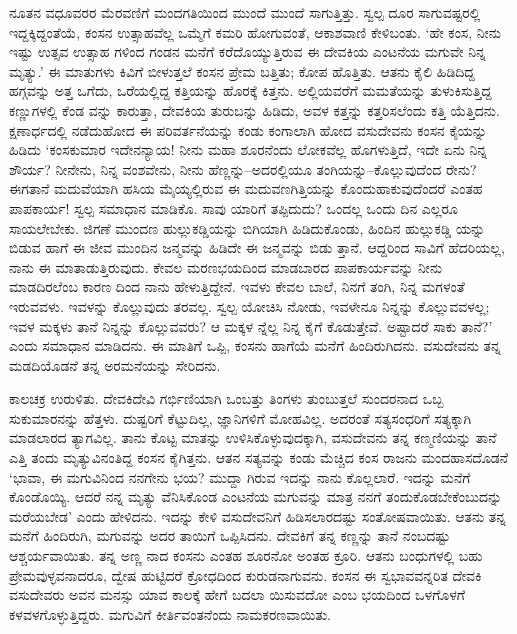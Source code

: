 ನೂತನ ವಧೂವರರ ಮೆರವಣಿಗೆ ಮಂದಗತಿಯಿಂದ ಮುಂದೆ ಮುಂದೆ ಸಾಗುತ್ತಿತ್ತು. ಸ್ವಲ್ಪ ದೂರ ಸಾಗುವಷ್ಟರಲ್ಲಿ ಇದ್ದಕ್ಕಿದ್ದಂತೆಯೆ, ಕಂಸನ ಉತ್ಸಾಹವೆಲ್ಲ ಒಮ್ಮೆಗೆ ಕಮರಿ ಹೋಗುವಂತೆ, ಆಕಾಶವಾಣಿ ಕೇಳಿಬಂತು. ‘ಹೇ ಕಂಸ, ನೀನು ಇಷ್ಟು ಉತ್ಸವ ಉತ್ಸಾಹ ಗಳಿಂದ ಗಂಡನ ಮನೆಗೆ ಕರೆದೊಯ್ಯುತ್ತಿರುವ ಈ ದೇವಕಿಯ ಎಂಟನೆಯ ಮಗುವೇ ನಿನ್ನ ಮೃತ್ಯು.’ ಈ ಮಾತುಗಳು ಕಿವಿಗೆ ಬೀಳುತ್ತಲೆ ಕಂಸನ ಪ್ರೇಮ ಬತ್ತಿತು; ಕೋಪ ಹೊತ್ತಿತು. ಆತನು ಕೈಲಿ ಹಿಡಿದಿದ್ದ ಹಗ್ಗವನ್ನು ಅತ್ತ ಒಗೆದು, ಒರೆಯಲ್ಲಿದ್ದ ಕತ್ತಿಯನ್ನು ಹೊರಕ್ಕೆ ಕಿತ್ತನು. ಅಲ್ಲಿಯವರೆಗೆ ಮಮತೆಯನ್ನು ತುಳುಕಿಸುತ್ತಿದ್ದ ಕಣ್ಣುಗಳಲ್ಲಿ ಕೆಂಡ ವನ್ನು ಕಾರುತ್ತಾ, ದೇವಕಿಯ ತುರುಬನ್ನು ಹಿಡಿದು, ಅವಳ ಕತ್ತನ್ನು ಕತ್ತರಿಸಲೆಂದು ಕತ್ತಿ ಯೆತ್ತಿದನು. ಕ್ಷಣಾರ್ಧದಲ್ಲಿ ನಡೆದುಹೋದ ಈ ಪರಿವರ್ತನೆಯನ್ನು ಕಂಡು ಕಂಗಾಲಾಗಿ ಹೋದ ವಸುದೇವನು ಕಂಸನ ಕೈಯನ್ನು ಹಿಡಿದು ‘ಕಂಸಕುಮಾರ ಇದೇನನ್ಯಾಯ! ನೀನು ಮಹಾ ಶೂರನೆಂದು ಲೋಕವೆಲ್ಲ ಹೊಗಳುತ್ತಿದೆ, ಇದೇ ಏನು ನಿನ್ನ ಶೌರ್ಯ? ನೀನೇನು, ನಿನ್ನ ವಂಶವೇನು, ನೀನು ಹೆಣ್ಣನ್ನು–ಅದರಲ್ಲಿಯೂ ತಂಗಿಯನ್ನು–ಕೊಲ್ಲುವುದೆಂದ ರೇನು? ಈಗತಾನೆ ಮದುವೆಯಾಗಿ ಹಸಿಯ ಮೈಯ್ಯಲ್ಲಿರುವ ಈ ಮದುವಣಗಿತ್ತಿಯನ್ನು ಕೊಂದುಹಾಕುವುದೆಂದರೆ ಎಂತಹ ಪಾಪಕಾರ್ಯ! ಸ್ವಲ್ಪ ಸಮಾಧಾನ ಮಾಡಿಕೊ. ಸಾವು ಯಾರಿಗೆ ತಪ್ಪಿದುದು? ಒಂದಲ್ಲ ಒಂದು ದಿನ ಎಲ್ಲರೂ ಸಾಯಲೇಬೇಕು. ಜಿಗಣೆ ಮುಂದಣ ಹುಲ್ಲುಕಡ್ಡಿಯನ್ನು ಬಿಗಿಯಾಗಿ ಹಿಡಿದುಕೊಂಡು, ಹಿಂದಿನ ಹುಲ್ಲುಕಡ್ಡಿ ಯನ್ನು ಬಿಡುವ ಹಾಗೆ ಈ ಜೀವ ಮುಂದಿನ ಜನ್ಮವನ್ನು ಹಿಡಿದೇ ಈ ಜನ್ಮವನ್ನು ಬಿಡು ತ್ತಾನೆ. ಆದ್ದರಿಂದ ಸಾವಿಗೆ ಹೆದರಿಯಲ್ಲ, ನಾನು ಈ ಮಾತಾಡುತ್ತಿರುವುದು. ಕೇವಲ ಮರಣಭಯದಿಂದ ಮಾಡಬಾರದ ಪಾಪಕಾರ್ಯವನ್ನು ನೀನು ಮಾಡದಿರಲೆಂಬ ಕಾರಣ ದಿಂದ ನಾನು ಹೇಳುತ್ತಿದ್ದೇನೆ. ಇವಳು ಕೇವಲ ಬಾಲೆ, ನಿನಗೆ ತಂಗಿ, ನಿನ್ನ ಮಗಳಂತೆ ಇರುವವಳು. ಇವಳನ್ನು ಕೊಲ್ಲುವುದು ತರವಲ್ಲ. ಸ್ವಲ್ಪ ಯೋಚಿಸಿ ನೋಡು, ಇವಳೇನೂ ನಿನ್ನನ್ನು ಕೊಲ್ಲುವವಳಲ್ಲ; ಇವಳ ಮಕ್ಕಳು ತಾನೆ ನಿನ್ನನ್ನು ಕೊಲ್ಲುವವರು? ಆ ಮಕ್ಕಳ ನ್ನೆಲ್ಲ ನಿನ್ನ ಕೈಗೆ ಕೊಡುತ್ತೇವೆ. ಅಷ್ಟಾದರೆ ಸಾಕು ತಾನೆ?’ ಎಂದು ಸಮಾಧಾನ ಮಾಡಿದನು. ಈ ಮಾತಿಗೆ ಒಪ್ಪಿ, ಕಂಸನು ಹಾಗೆಯೆ ಮನೆಗೆ ಹಿಂದಿರುಗಿದನು. ವಸುದೇವನು ತನ್ನ ಮಡದಿಯೊಡನೆ ತನ್ನ ಅರಮನೆಯನ್ನು ಸೇರಿದನು.

ಕಾಲಚಕ್ರ ಉರುಳಿತು. ದೇವಕಿದೇವಿ ಗರ್ಭಿಣಿಯಾಗಿ ಒಂಬತ್ತು ತಿಂಗಳು ತುಂಬುತ್ತಲೆ ಸುಂದರನಾದ ಒಬ್ಬ ಸುಕುಮಾರನನ್ನು ಹೆತ್ತಳು. ದುಷ್ಟರಿಗೆ ಕೆಟ್ಟುದಿಲ್ಲ, ಜ್ಞಾನಿಗಳಿಗೆ ಮೋಹವಿಲ್ಲ. ಅದರಂತೆ ಸತ್ಯಸಂಧರಿಗೆ ಸತ್ಯಕ್ಕಾಗಿ ಮಾಡಲಾರದ ತ್ಯಾಗವಿಲ್ಲ. ತಾನು ಕೊಟ್ಟ ಮಾತನ್ನು ಉಳಿಸಿಕೊಳ್ಳುವುದಕ್ಕಾಗಿ, ವಸುದೇವನು ತನ್ನ ಕಣ್ಮಣಿಯನ್ನು ತಾನೆ ಎತ್ತಿ ತಂದು ಮೃತ್ಯುವಿನಂತಿದ್ದ ಕಂಸನ ಕೈಗಿತ್ತನು. ಆತನ ಸತ್ಯವನ್ನು ಕಂಡು ಮೆಚ್ಚಿದ ಕಂಸ ರಾಜನು ಮಂದಹಾಸದೊಡನೆ ‘ಭಾವಾ, ಈ ಮಗುವಿನಿಂದ ನನಗೇನು ಭಯ? ಮುದ್ದಾ ಗಿರುವ ಇದನ್ನು ನಾನು ಕೊಲ್ಲಲಾರೆ. ಇದನ್ನು ಮನೆಗೆ ಕೊಂಡೊಯ್ಯಿ. ಆದರೆ ನನ್ನ ಮೃತ್ಯು ವೆನಿಸಿಕೊಂಡ ಎಂಟನೆಯ ಮಗುವನ್ನು ಮಾತ್ರ ನನಗೆ ತಂದುಕೊಡಬೇಕೆಂಬುದನ್ನು ಮರೆಯಬೇಡ’ ಎಂದು ಹೇಳಿದನು. ಇದನ್ನು ಕೇಳಿ ವಸುದೇವನಿಗೆ ಹಿಡಿಸಲಾರದಷ್ಟು ಸಂತೋಷವಾಯಿತು. ಆತನು ತನ್ನ ಮನೆಗೆ ಹಿಂದಿರುಗಿ, ಮಗುವನ್ನು ಅದರ ತಾಯಿಗೆ ಒಪ್ಪಿಸಿದನು. ದೇವಕಿಗೆ ತನ್ನ ಕಣ್ಣನ್ನು ತಾನೆ ನಂಬದಷ್ಟು ಆಶ್ಚರ್ಯವಾಯಿತು. ತನ್ನ ಅಣ್ಣ ನಾದ ಕಂಸನು ಎಂತಹ ಶೂರನೋ ಅಂತಹ ಕ್ರೂರಿ. ಆತನು ಬಂಧುಗಳಲ್ಲಿ ಬಹು ಪ್ರೇಮವುಳ್ಳವನಾದರೂ, ದ್ವೇಷ ಹುಟ್ಟಿದರೆ ಕ್ರೋಧದಿಂದ ಕುರುಡನಾಗುವನು. ಕಂಸನ ಈ ಸ್ವಭಾವವನ್ನರಿತ ದೇವಕಿ ವಸುದೇವರು ಅವನ ಮನಸ್ಸು ಯಾವ ಕಾಲಕ್ಕೆ ಹೇಗೆ ಬದಲಾ ಯಿಸುವದೋ ಎಂಬ ಭಯದಿಂದ ಒಳಗೊಳಗೆ ಕಳವಳಗೊಳ್ಳುತ್ತಿದ್ದರು. ಮಗುವಿಗೆ ಕೀರ್ತಿವಂತನೆಂದು ನಾಮಕರಣವಾಯಿತು.

